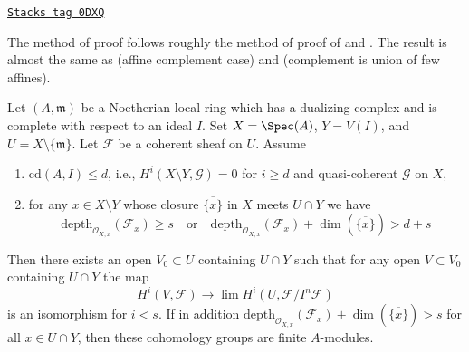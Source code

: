 \begin{theorem}
\label{algebraization-theorem-algebraization-formal-sections}
\href{https://stacks.math.columbia.edu/tag/0DXQ}{\texttt{Stacks tag 0DXQ}}

\begin{reference}
The method of proof follows roughly the method of
proof of \cite[Theorem 1]{Faltings-algebraisation}
and \cite[Satz 2]{Faltings-uber}.
The result is almost the same as
\cite[Theorem 1.1]{MRaynaud-paper} (affine complement case) and
\cite[Theorem 3.9]{MRaynaud-book} (complement is union of few affines).
\end{reference}
Let $(A, \mathfrak m)$ be a Noetherian local ring which has a
dualizing complex and is complete with respect to an ideal $I$.
Set $X = \Spec(A)$, $Y = V(I)$, and $U = X \setminus \{\mathfrak m\}$.
Let $\mathcal{F}$ be a coherent sheaf on $U$.
Assume
\begin{enumerate}
\item $\text{cd}(A, I) \leq d$, i.e.,
$H^i(X \setminus Y, \mathcal{G}) = 0$ for $i \geq d$ and
quasi-coherent $\mathcal{G}$ on $X$,
\item for any $x \in X \setminus Y$ whose closure $\overline{\{x\}}$
in $X$ meets $U \cap Y$ we have
$$
\text{depth}_{\mathcal{O}_{X, x}}(\mathcal{F}_x) \geq s
\quad\text{or}\quad
\text{depth}_{\mathcal{O}_{X, x}}(\mathcal{F}_x)
+ \dim(\overline{\{x\}}) > d + s
$$
\end{enumerate}
Then there exists an open $V_0 \subset U$ containing $U \cap Y$
such that for any open $V \subset V_0$ containing $U \cap Y$
the map
$$
H^i(V, \mathcal{F}) \to \lim H^i(U, \mathcal{F}/I^n\mathcal{F})
$$
is an isomorphism for $i < s$. If in addition
$
\text{depth}_{\mathcal{O}_{X, x}}(\mathcal{F}_x) +
\dim(\overline{\{x\}}) > s
$
for all $x \in U \cap Y$, then these cohomology groups are finite $A$-modules.
\end{theorem}


